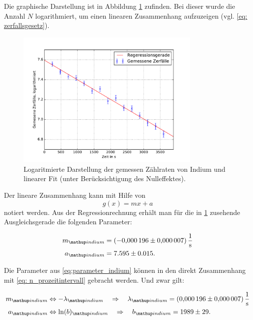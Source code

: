 Die graphische Darstellung ist in Abbildung \ref{fig: plot_indium} zufinden. Bei dieser wurde
die Anzahl $N$ logarithmiert, um einen linearen Zusammenhang aufzuzeigen (vgl. \eqref{eq: zerfallsgesetz}).
\begin{figure}
  \centering
  \includegraphics[width=0.8\textwidth]{pics/logarithmiert_indium.pdf}
  \caption{Logaritmierte Darstellung der gemessen Zählraten von Indium und linearer Fit  (unter Berücksichtigung des Nulleffektes).}
  \label{fig: plot_indium}
\end{figure}

Der lineare Zusammenhang kann mit Hilfe von
\begin{equation*}
  g(x)=mx+a
\end{equation*}
notiert werden.
Aus der Regressionrechnung erhält man für die in \ref{fig: plot_indium} zusehende
Ausgleichsgerade die folgenden Parameter:

\begin{align}
  \label{eq:parameter_indium}
  \begin{aligned}
    m\ua{indium}&=\SI{-0.000196\pm0.000007}{\per\second}\\
    a\ua{indium}&=7.595\pm0.015.
  \end{aligned}
\end{align}

Die Parameter aus \eqref{eq:parameter_indium} können in den direkt Zusammenhang mit
\eqref{eq: n_prozeitintervall} gebracht werden. Und zwar gilt:

\begin{align}
  \label{eq:parameter_indium}
  \begin{aligned}
    m\ua{indium}&\Leftrightarrow -\lambda\ua{indium} \quad \Rightarrow \quad \lambda\ua{indium}=\SI{0.000196\pm0.000007}{\per\second}\\
    a\ua{indium}&\Leftrightarrow \ln(b)\ua{indium} \quad \Rightarrow \quad b\ua{indium} =1989\pm 29.
  \end{aligned}
\end{align}

